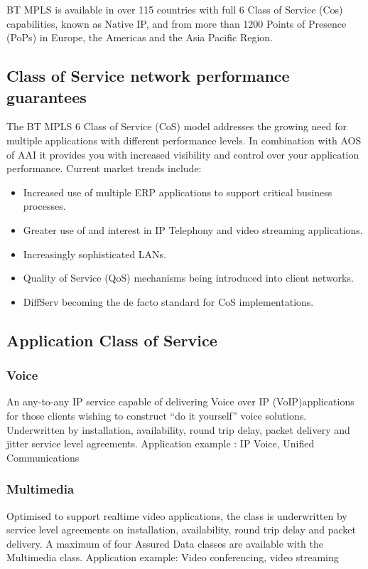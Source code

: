 BT MPLS is available in over 115 countries with full 6 Class of Service (Cos) capabilities, known as Native IP, and from more than 1200 Points of Presence (PoPs) in Europe, the Americas and the Asia Pacific Region.

\subsection{Class of Service network performance guarantees}
The BT MPLS 6 Class of Service (CoS) model addresses the growing need for multiple applications with different performance levels. In combination with AOS of AAI it provides you with increased visibility and control over your application performance. Current market trends include:

\begin{itemize}
\item Increased use of multiple ERP applications to support critical business processes.
\item Greater use of and interest in IP Telephony and video streaming applications.
\item Increasingly sophisticated LANs.
\item Quality of Service (QoS) mechanisms being introduced into client networks.
\item DiffServ becoming the de facto standard for CoS implementations.
\end{itemize}


\subsection{Application Class of Service}

\subsubsection{Voice}
An any-to-any IP service capable of delivering Voice over IP (VoIP)applications for those clients wishing to construct ``do it yourself'' voice solutions. Underwritten by installation, availability, round trip delay, packet delivery and jitter service level agreements.
Application example : IP Voice, Unified Communications

\subsubsection{Multimedia}
Optimised to support realtime video applications, the class is underwritten by service level agreements on installation, availability, round trip delay and packet delivery. A maximum of four Assured Data classes are available with the Multimedia class.
Application example: Video conferencing, video streaming

